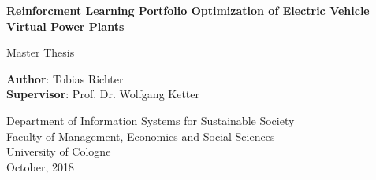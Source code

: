 \begin{titlepage}
    \begin{center}
        \vspace*{1cm}

        \Large
        \textbf{Reinforcment Learning Portfolio Optimization of Electric Vehicle Virtual Power Plants}

        \vspace{1.5cm}
        Master Thesis

        \vspace{8.0cm}

        \large
        \textbf{Author}: Tobias Richter\\
        \large
        \textbf{Supervisor}: Prof. Dr. Wolfgang Ketter

        \vspace{1cm}
        \large
        Department of Information Systems for Sustainable Society\\
        Faculty of Management, Economics and Social Sciences\\
        University of Cologne\\

        \vspace{1cm}
        October, 2018

    \end{center}
\end{titlepage}
